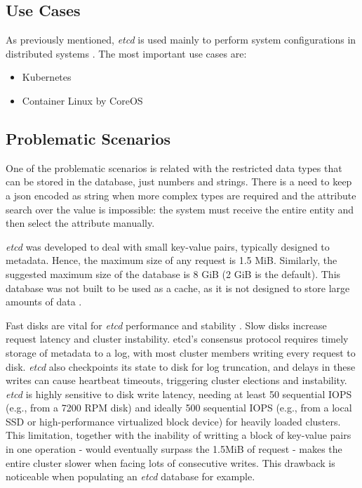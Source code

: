 \documentclass[screen,review]{acmart}
\begin{document}
\subsection{Use Cases}
As previously mentioned, \textit{etcd} is used mainly to perform system configurations in distributed systems \cite{etcd_why}.
The most important use cases are:

\begin{itemize}
    \item Kubernetes
    \item Container Linux by CoreOS
\end{itemize}

\subsection{Problematic Scenarios}

One of the problematic scenarios is related with the restricted data types that can be stored in the database, just numbers and strings. There is a need to keep a json encoded as string when more complex types are required and the attribute search over the value is impossible: the system must receive the entire entity and then select the attribute manually.

\textit{etcd} was developed to deal with small key-value pairs, typically designed to metadata. Hence, the maximum size of any request is 1.5 MiB. Similarly, the suggested maximum size of the database is 8 GiB (2 GiB is the default). This database was not built to be used as a cache, as it is not designed to store large amounts of data \cite{etcd_sys_limits}.

Fast disks are vital for \textit{etcd} performance and stability \cite{etcd_hw}. Slow disks increase request latency and cluster instability. etcd's consensus protocol requires timely storage of metadata to a log, with most cluster members writing every request to disk. \textit{etcd} also checkpoints its state to disk for log truncation, and delays in these writes can cause heartbeat timeouts, triggering cluster elections and instability. \textit{etcd} is highly sensitive to disk write latency, needing at least 50 sequential IOPS (e.g., from a 7200 RPM disk) and ideally 500 sequential IOPS (e.g., from a local SSD or high-performance virtualized block device) for heavily loaded clusters. This limitation, together with the inability of writting a block of key-value pairs in one operation - would eventually surpass the 1.5MiB of request - makes the entire cluster slower when facing lots of consecutive writes. This drawback is noticeable when populating an \textit{etcd} database for example.
\end{document}
